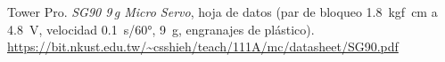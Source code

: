  Tower Pro. \emph{SG90 9\,g Micro Servo}, hoja de datos (par de bloqueo
  \SI{1.8}{kgf.cm} a \SI{4.8}{V}, velocidad \SI{0.1}{s}/\ang{60}, \SI{9}{g}, engranajes de
  plástico). \url{https://bit.nkust.edu.tw/~csshieh/teach/111A/mc/datasheet/SG90.pdf}
